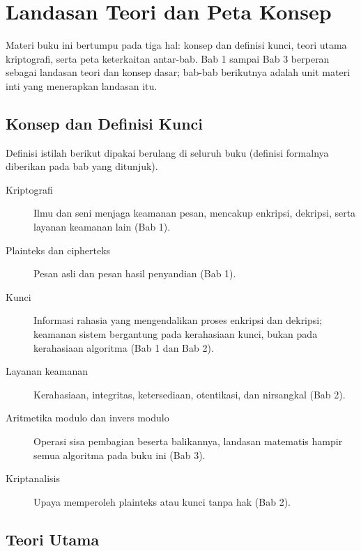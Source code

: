 \documentclass[../main.tex]{subfiles}
\begin{document}
\chapter*{Landasan Teori dan Peta Konsep}

Materi buku ini bertumpu pada tiga hal: konsep dan definisi kunci, teori utama
kriptografi, serta peta keterkaitan antar-bab. Bab 1 sampai Bab 3 berperan
sebagai landasan teori dan konsep dasar; bab-bab berikutnya adalah unit materi
inti yang menerapkan landasan itu.

\section*{Konsep dan Definisi Kunci}

Definisi istilah berikut dipakai berulang di seluruh buku (definisi formalnya
diberikan pada bab yang ditunjuk).

\begin{description}
    \item[Kriptografi] Ilmu dan seni menjaga keamanan pesan, mencakup
          enkripsi, dekripsi, serta layanan keamanan lain (Bab 1).
    \item[Plainteks dan cipherteks] Pesan asli dan pesan hasil penyandian
          (Bab 1).
    \item[Kunci] Informasi rahasia yang mengendalikan proses enkripsi dan
          dekripsi; keamanan sistem bergantung pada kerahasiaan kunci, bukan
          pada kerahasiaan algoritma (Bab 1 dan Bab 2).
    \item[Layanan keamanan] Kerahasiaan, integritas, ketersediaan,
          otentikasi, dan nirsangkal (Bab 2).
    \item[Aritmetika modulo dan invers modulo] Operasi sisa pembagian beserta
          balikannya, landasan matematis hampir semua algoritma pada buku ini
          (Bab 3).
    \item[Kriptanalisis] Upaya memperoleh plainteks atau kunci tanpa hak
          (Bab 2).
\end{description}

\section*{Teori Utama}
\end{document}
